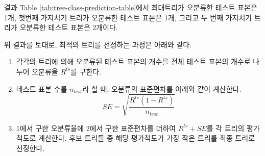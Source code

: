\documentclass[]{book}
\newenvironment{Shaded}{\begin{snugshade}}{\end{snugshade}}
\newcommand{\DataTypeTok}[1]{\textcolor[rgb]{0.13,0.29,0.53}{#1}}
\newcommand{\DecValTok}[1]{\textcolor[rgb]{0.00,0.00,0.81}{#1}}
\newcommand{\KeywordTok}[1]{\textcolor[rgb]{0.13,0.29,0.53}{\textbf{#1}}}
\newcommand{\NormalTok}[1]{#1}
\newcommand{\OperatorTok}[1]{\textcolor[rgb]{0.81,0.36,0.00}{\textbf{#1}}}
\newcommand{\StringTok}[1]{\textcolor[rgb]{0.31,0.60,0.02}{#1}}
\providecommand{\tightlist}{%
  \setlength{\itemsep}{0pt}\setlength{\parskip}{0pt}}
\begin{document}
결과 Table \ref{tab:tree-class-prediction-table}에서 최대트리가 오분류한 테스트 표본은 1개, 첫번째 가지치기 트리가 오분류한 테스트 표본은 1개, 그리고 두 번째 가지치기 트리가 오분류한 테스트 표본은 2개이다.

위 결과를 토대로, 최적의 트리를 선정하는 과정은 아래와 같다.

\begin{enumerate}
\def\labelenumi{\arabic{enumi}.}
\tightlist
\item
  각각의 트리에 의해 오분류된 테스트 표본의 개수를 전체 테스트 표본의 개수로 나누어 오분류율 \(R^{ts}\)를 구한다.
\item
  테스트 표본 수를 \(n_{test}\)라 할 때, 오분류의 표준편차를 아래와 같이 계산한다.
  \[SE = \sqrt{\frac{R^{ts}(1 - R^{ts})}{n_{test}}}\]
\item
  1에서 구한 오분류율에 2에서 구한 표준편차를 더하여 \(R^{ts} + SE\)를 각 트리의 평가척도로 계산한다. 후보 트리들 중 해당 평가척도가 가장 작은 트리를 최종 트리로 선정한다.
\end{enumerate}

\begin{Shaded}
\end{Shaded}
\end{document}
